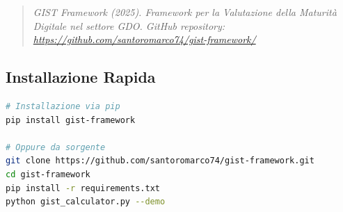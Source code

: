 \begin{quote}
\small
\textit{GIST Framework (2025). Framework per la Valutazione della Maturità Digitale nel settore GDO. GitHub repository: \url{https://github.com/santoromarco74/gist-framework/}}
\end{quote}

\subsection*{Installazione Rapida}

\begin{lstlisting}[language=bash, basicstyle=\small\ttfamily]
# Installazione via pip
pip install gist-framework

# Oppure da sorgente
git clone https://github.com/santoromarco74/gist-framework.git
cd gist-framework
pip install -r requirements.txt
python gist_calculator.py --demo
\end{lstlisting}